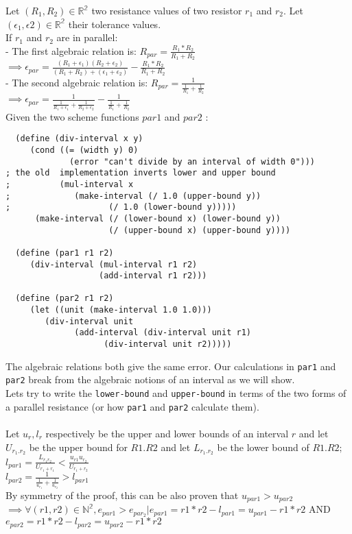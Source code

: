 \documentclass{article}
\begin{document}
\noindent Let $ (R_1,R_2) \in \mathbb{R^2} $ two resistance values of two resistor $r_1$ and $r_2$. Let $ (\epsilon_1,\epsilon2) \in \mathbb{R^2} $ their tolerance values.\\
If $r_1$ and $r_2$ are in parallel: \\
- The first algebraic relation is: $ R_{par} = \frac{R_1*R_2}{R_1 + R_2} $\\
$\implies \epsilon_{par} =  \frac{(R_1+\epsilon_1)(R_2+\epsilon_2)}{(R_1 + R_2) + (\epsilon_1 + \epsilon_2)} -  \frac{R_1*R_2}{R_1 + R_2} $\\
- The second algebraic relation is: $R_{par} = \frac{1}{\frac{1}{R_1} + \frac{1}{R_2}} $\\
$\implies \epsilon_{par} =  \frac{1}{\frac{1}{R_1+\epsilon_1} + \frac{1}{R_2+\epsilon_2}} - \frac{1}{\frac{1}{R_1} + \frac{1}{R_2}}$\\
Given the two scheme functions $par1$ and $par2$ :\\
\begin{lstlisting}
  (define (div-interval x y)
     (cond ((= (width y) 0)
             (error "can't divide by an interval of width 0")))
; the old  implementation inverts lower and upper bound
;          (mul-interval x
;	          (make-interval (/ 1.0 (upper-bound y))
;	           		 (/ 1.0 (lower-bound y)))))
      (make-interval (/ (lower-bound x) (lower-bound y))
                     (/ (upper-bound x) (upper-bound y))))
  
  (define (par1 r1 r2)
     (div-interval (mul-interval r1 r2)
                   (add-interval r1 r2)))

  (define (par2 r1 r2)
     (let ((unit (make-interval 1.0 1.0)))
        (div-interval unit
		      (add-interval (div-interval unit r1)
				    (div-interval unit r2)))))
\end{lstlisting}


\noindent The algebraic relations both give the same error. Our calculations in \texttt{par1} and \texttt{par2} break from the algebraic notions  of an interval as we will show.\\
Lets try to write the \texttt{lower-bound} and \texttt{upper-bound} in terms of the two forms of a parallel resistance (or how \texttt{par1} and \texttt{par2} calculate them).\\ \\
Let $u_{r} , l_{r}$ respectively be the upper and lower bounds of an interval $r$ and let $U_{r_1.r_2}$  be the upper bound for $R1.R2$ and let $L_{r_1.r_2}$ be the lower bound of $R1 . R2;$\\
\noindent$l_{par1} =  \frac{L_{r_1r_2}}{U_{r_1+ r_1}} < \frac{u_{r1}u_{r_2}}{U_{r_1+r_2}} $\\
\noindent$ l_{par2} = \frac{1}{\frac{1}{u_{r_1}} + \frac{1}{u_{r_2}}} > l_{par1} $\\
By symmetry of the proof, this can be also proven that $u_{par1} > u_{par2}$\\
$\implies \forall (r1,r2) \in \mathbb{N^2}, e_{par1} > e_{par_2} | e_{par1} = r1*r2 - l_{par1} = u_{par1} - r1*r2 $ AND $ e_{par2} = r1*r2 - l_{par2} = u_{par2} - r1*r2 $
\end{document}
